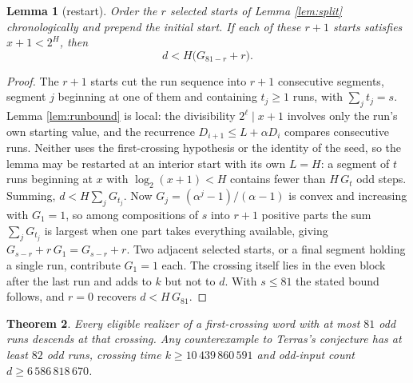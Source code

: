 \documentclass[11pt,a4paper]{article}
\theoremstyle{plain}\newtheorem{theorem}{Theorem}\newtheorem{proposition}[theorem]{Proposition}
\newtheorem{lemma}[theorem]{Lemma}\newtheorem{corollary}[theorem]{Corollary}
\theoremstyle{definition}\newtheorem{example}[theorem]{Example}
\theoremstyle{remark}\newtheorem{remark}[theorem]{Remark}
\begin{document}
\begin{lemma}[restart]\label{lem:restart}
Order the $r$ selected starts of Lemma \ref{lem:split} chronologically and prepend the initial
start. If each of these $r+1$ starts satisfies $x+1<2^H$, then
\[
 d<H\bigl(G_{81-r}+r\bigr).
\]
\end{lemma}
\begin{proof}
The $r+1$ starts cut the run sequence into $r+1$ consecutive segments, segment $j$ beginning at
one of them and containing $t_j\ge1$ runs, with $\sum_j t_j=s$. Lemma \ref{lem:runbound} is
local: the divisibility $2^{\ell}\mid x+1$ involves only the run's own starting value, and the
recurrence $D_{i+1}\le L+\alpha D_i$ compares consecutive runs. Neither uses the first-crossing
hypothesis or the identity of the seed, so the lemma may be restarted at an interior start with
its own $L=H$: a segment of $t$ runs beginning at $x$ with $\log_2(x+1)<H$ contains fewer than
$H\,G_t$ odd steps. Summing, $d<H\sum_j G_{t_j}$. Now $G_j=(\alpha^j-1)/(\alpha-1)$ is convex
and increasing with $G_1=1$, so among compositions of $s$ into $r+1$ positive parts the sum
$\sum_j G_{t_j}$ is largest when one part takes everything available, giving
$G_{s-r}+r\,G_1=G_{s-r}+r$. Two adjacent selected starts, or a final segment holding a single
run, contribute $G_1=1$ each. The crossing itself lies in the even block after the last run and
adds to $k$ but not to $d$. With $s\le81$ the stated bound follows, and $r=0$ recovers
$d<H\,G_{81}$.
\end{proof}

\begin{theorem}\label{thm:75}
Every eligible realizer of a first-crossing word with at most $81$ odd runs descends at that
crossing. Any counterexample to Terras's conjecture has at least $82$ odd runs, crossing time
$k\ge10\,439\,860\,591$ and odd-input count $d\ge6\,586\,818\,670$.
\end{theorem}
\end{document}
